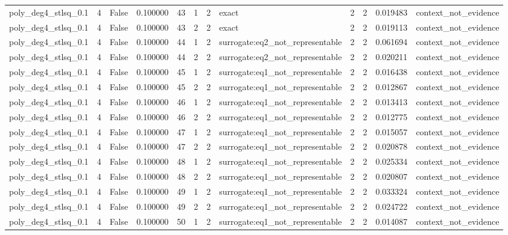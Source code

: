 \begin{tabular}{lrrrrrrlrrrl}
poly\_deg4\_stlsq\_0.1 & 4 & False & 0.100000 & 43 & 1 & 2 & exact & 2 & 2 & 0.019483 & context\_not\_evidence \\
poly\_deg4\_stlsq\_0.1 & 4 & False & 0.100000 & 43 & 2 & 2 & exact & 2 & 2 & 0.019113 & context\_not\_evidence \\
poly\_deg4\_stlsq\_0.1 & 4 & False & 0.100000 & 44 & 1 & 2 & surrogate:eq2\_not\_representable & 2 & 2 & 0.061694 & context\_not\_evidence \\
poly\_deg4\_stlsq\_0.1 & 4 & False & 0.100000 & 44 & 2 & 2 & surrogate:eq2\_not\_representable & 2 & 2 & 0.020211 & context\_not\_evidence \\
poly\_deg4\_stlsq\_0.1 & 4 & False & 0.100000 & 45 & 1 & 2 & surrogate:eq1\_not\_representable & 2 & 2 & 0.016438 & context\_not\_evidence \\
poly\_deg4\_stlsq\_0.1 & 4 & False & 0.100000 & 45 & 2 & 2 & surrogate:eq1\_not\_representable & 2 & 2 & 0.012867 & context\_not\_evidence \\
poly\_deg4\_stlsq\_0.1 & 4 & False & 0.100000 & 46 & 1 & 2 & surrogate:eq1\_not\_representable & 2 & 2 & 0.013413 & context\_not\_evidence \\
poly\_deg4\_stlsq\_0.1 & 4 & False & 0.100000 & 46 & 2 & 2 & surrogate:eq1\_not\_representable & 2 & 2 & 0.012775 & context\_not\_evidence \\
poly\_deg4\_stlsq\_0.1 & 4 & False & 0.100000 & 47 & 1 & 2 & surrogate:eq1\_not\_representable & 2 & 2 & 0.015057 & context\_not\_evidence \\
poly\_deg4\_stlsq\_0.1 & 4 & False & 0.100000 & 47 & 2 & 2 & surrogate:eq1\_not\_representable & 2 & 2 & 0.020878 & context\_not\_evidence \\
poly\_deg4\_stlsq\_0.1 & 4 & False & 0.100000 & 48 & 1 & 2 & surrogate:eq1\_not\_representable & 2 & 2 & 0.025334 & context\_not\_evidence \\
poly\_deg4\_stlsq\_0.1 & 4 & False & 0.100000 & 48 & 2 & 2 & surrogate:eq1\_not\_representable & 2 & 2 & 0.020807 & context\_not\_evidence \\
poly\_deg4\_stlsq\_0.1 & 4 & False & 0.100000 & 49 & 1 & 2 & surrogate:eq1\_not\_representable & 2 & 2 & 0.033324 & context\_not\_evidence \\
poly\_deg4\_stlsq\_0.1 & 4 & False & 0.100000 & 49 & 2 & 2 & surrogate:eq1\_not\_representable & 2 & 2 & 0.024722 & context\_not\_evidence \\
poly\_deg4\_stlsq\_0.1 & 4 & False & 0.100000 & 50 & 1 & 2 & surrogate:eq1\_not\_representable & 2 & 2 & 0.014087 & context\_not\_evidence \\

\end{tabular}
